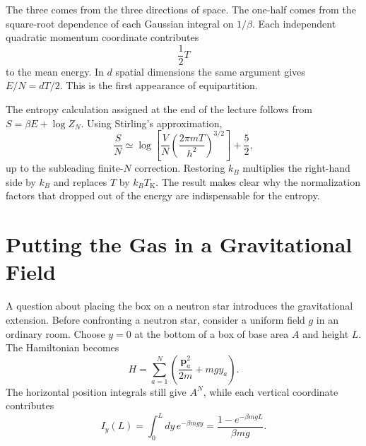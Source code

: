\begin{classroomqa}
\end{classroomqa}

The three comes from the three directions of space.  The one-half comes
from the square-root dependence of each Gaussian integral on \(1/\beta\).
Each independent quadratic momentum coordinate contributes
\begin{equation}
 \frac{1}{2}T
\end{equation}
to the mean energy.  In \(d\) spatial dimensions the same argument gives
\(E/N=dT/2\).  This is the first appearance of equipartition.

The entropy calculation assigned at the end of the lecture follows from
\(S=\beta E+\log Z_N\).  Using Stirling's approximation,
\begin{equation}
 \frac{S}{N}
 \simeq
 \log\!\left[
  \frac{V}{N}
  \left(\frac{2\pi mT}{h^2}\right)^{3/2}
 \right]
 +\frac{5}{2},
 \label{eq:sm4-sackur-tetrode}
\end{equation}
up to the subleading finite-\(N\) correction.  Restoring \(k_B\) multiplies
the right-hand side by \(k_B\) and replaces \(T\) by
\(k_BT_{\mathrm K}\).  The result makes clear why the normalization factors
that dropped out of the energy are indispensable for the entropy.

\section{Putting the Gas in a Gravitational Field}

A question about placing the box on a neutron star introduces the
gravitational extension.  Before confronting a neutron star, consider a
uniform field \(g\) in an ordinary room.  Choose \(y=0\) at the bottom of a
box of base area \(A\) and height \(L\).  The Hamiltonian becomes
\begin{equation}
 H=\sum_{a=1}^{N}
 \left(\frac{\bm p_a^2}{2m}+mgy_a\right).
 \label{eq:sm4-gravity-hamiltonian}
\end{equation}
The horizontal position integrals still give \(A^N\), while each vertical
coordinate contributes
\begin{equation}
 I_y(L)
 =\int_0^Ldy\,e^{-\beta mgy}
 =\frac{1-e^{-\beta mgL}}{\beta mg}.
 \label{eq:sm4-finite-height-integral}
\end{equation}

